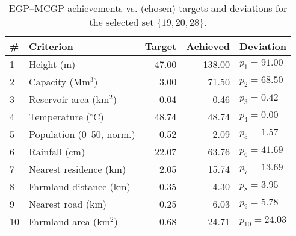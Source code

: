 \begin{table}[htbp]
\centering
\caption{EGP--MCGP achievements vs. (chosen) targets and deviations for the selected set $\{19,20,28\}$.}
\label{tab:egpMCGPAchievementVsTarget}
\begin{tabular}{llrrl}
\toprule
\# & Criterion & Target & Achieved & Deviation \\
\midrule
1  & Height (m)                   & 47.00  & 138.00 & $p_1=91.00$ \\
2  & Capacity (Mm$^3$)            & 3.00   & 71.50  & $p_2=68.50$ \\
3  & Reservoir area (km$^2$)      & 0.04   & 0.46   & $p_3=0.42$ \\
4  & Temperature ($^{\circ}$C)    & 48.74  & 48.74  & $p_4=0.00$ \\
5  & Population (0--50, norm.)    & 0.52   & 2.09   & $p_5=1.57$ \\
6  & Rainfall (cm)                & 22.07  & 63.76  & $p_6=41.69$ \\
7  & Nearest residence (km)       & 2.05   & 15.74  & $p_7=13.69$ \\
8  & Farmland distance (km)       & 0.35   & 4.30   & $p_8=3.95$ \\
9  & Nearest road (km)            & 0.25   & 6.03   & $p_9=5.78$ \\
10 & Farmland area (km$^2$)       & 0.68   & 24.71  & $p_{10}=24.03$ \\
\bottomrule
\end{tabular}
\end{table}